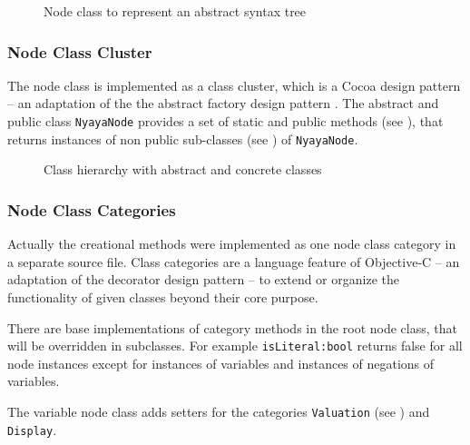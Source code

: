 \begin{figure}[htbp]
\begin{center}
\caption{Node class to represent an abstract syntax tree}
\label{fig:NyayaNode}
\end{center}
\end{figure}

\subsubsection{Node Class Cluster}

The node class is implemented as a class cluster, 
which is a Cocoa design pattern \cite[p.282ff]{Buck:2009:CDP:1803585}
– an adaptation of the the abstract factory design pattern \cite[p.87ff]{GAMMAETAL}.
The abstract and public class \verb+NyayaNode+ 
provides a set of static and public methods (see ),
that returns instances of non public sub-classes (see )
of \verb+NyayaNode+.

\begin{figure}[htbp]
\begin{center}
\caption{Class hierarchy with abstract and concrete classes}
\label{fig:NyayaNodeCluster}
\end{center}
\end{figure}

\subsubsection{Node Class Categories}

Actually the creational methods were implemented as one node class category in a separate source file. 
Class categories are a language feature of Objective-C \cite[p.225ff]{Kochan:2009:PO:1538451}
– an adaptation of the decorator design pattern \cite[p.175ff]{GAMMAETAL} – 
to extend or organize the functionality of given classes beyond their core purpose.

There are base implementations of category methods in the root node class,
that will be overridden in subclasses.
For example \verb+isLiteral:bool+ returns false for all node instances
except for instances of variables
and instances of negations of variables.

The variable node class adds setters for the categories \verb+Valuation+  
(see ) and \verb+Display+.




